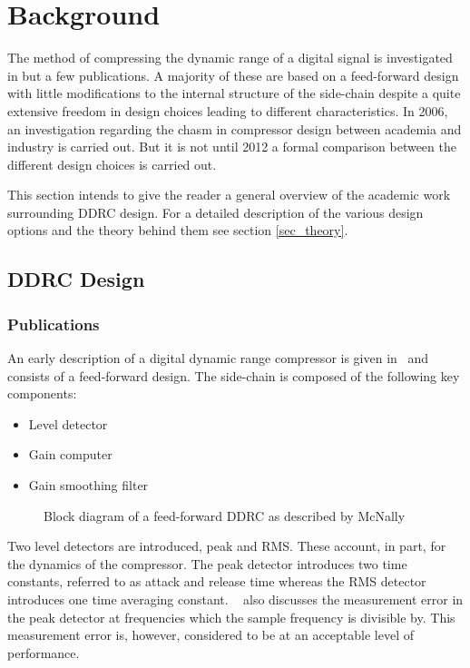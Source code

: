 \documentclass[../main2.tex]{subfiles}
\providecommand{\rootdir}{..}
\begin{document}
\section{Background} \label{background}
The method of compressing the dynamic range of a digital signal is investigated in but a few publications. A majority of these are based on a feed-forward design with little modifications to the internal structure of the side-chain despite a quite extensive freedom in design choices leading to different characteristics.  In 2006, an investigation regarding the chasm in compressor design between academia and industry is carried out. But it is not until 2012 a formal comparison between the different design choices is carried out.

This section intends to give the reader a general overview of the academic work surrounding DDRC design. For a detailed description of the various design options and the theory behind them see section \ref{sec_theory}.

\FloatBarrier
\subsection{DDRC Design}
\subsubsection{Publications}
An early description of a digital dynamic range compressor is given in~\cite{mcnally1984dynamic} and consists of a feed-forward  design. The side-chain is composed of the following key components:
\begin{itemize}
\item{Level detector}
\item{Gain computer}
\item{Gain smoothing filter}
\end{itemize}
\begin{figure}
\centerline{}
\caption{Block diagram of a feed-forward DDRC as described by McNally}
\label{fig:block_mcnally}
\end{figure}
Two level detectors are introduced, peak and RMS. These account, in part, for the dynamics of the compressor. The peak detector introduces two time constants, referred to as attack and release time whereas the RMS detector introduces one time averaging constant. ~\cite{mcnally1984dynamic} also discusses the measurement error in the peak detector at frequencies which the sample frequency is divisible by. This measurement error is, however, considered to be at an acceptable level of performance.
\end{document}
